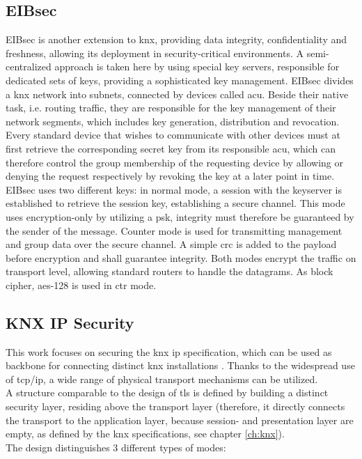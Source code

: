 \subsection{EIBsec}

EIBsec is another extension to \gls{knx}, providing data integrity, confidentiality and freshness, allowing its deployment in security-critical environments.
A semi-centralized approach is taken here by using special key servers, responsible for dedicated sets
of keys, providing a sophisticated key management. EIBsec divides a \gls{knx} network into subnets, connected by devices called \gls{acu}. Beside their native
task, i.e. routing traffic, they
 are responsible for the key management of their network segments, which includes key generation, distribution and revocation. Every standard device that
 wishes to communicate with other devices must at first retrieve the corresponding secret key from its responsible \gls{acu}, which can therefore control the
 group membership of the requesting device by allowing or denying the request respectively by revoking the key at a later point in time.
\\
EIBsec uses two different keys: in normal mode, a session with the keyserver is established to retrieve the session key, establishing a secure channel.
This mode uses encryption-only by utilizing a \gls{psk}, integrity must therefore be guaranteed by the sender of the message. Counter mode is used for transmitting management and
group data over the secure channel. A simple \gls{crc} is added to the payload before encryption and shall guarantee integrity. Both modes encrypt the traffic
on transport level, allowing standard routers to handle the datagrams. As block cipher, \gls{aes}-128 is used in \gls{ctr} mode.

\subsection{KNX IP Security}

This work focuses on securing the \gls{knx} \gls{ip} specification, which can be used as backbone for connecting distinct \gls{knx} installations \cite{5195839}.
Thanks to the widespread use of \gls{tcp}/\gls{ip}, a wide range of physical transport mechanisms can be utilized.
\\
A structure comparable to the design of \gls{tls} is defined by building a distinct security layer, residing above the transport layer (therefore, it directly
connects the transport to the application layer, because session- and presentation layer are empty, as defined by the \gls{knx} specifications, see chapter
\ref{ch:knx}).
\\
The design distinguishes 3 different types of modes: 

